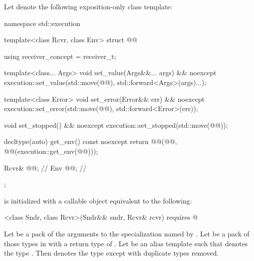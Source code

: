 \pnum
Let  denote the following exposition-only class template:
\begin{codeblock}
namespace std::execution {
  template<class Rcvr, class Env>
  struct @@ {
    using receiver_concept = receiver_t;

    template<class... Args>
    void set_value(Args&&... args) && noexcept {
      execution::set_value(std::move(@@), std::forward<Args>(args)...);
    }

    template<class Error>
    void set_error(Error&& err) && noexcept {
      execution::set_error(std::move(@@), std::forward<Error>(err));
    }

    void set_stopped() && noexcept {
      execution::set_stopped(std::move(@@));
    }

    decltype(auto) get_env() const noexcept {
      return @@(@@, @@(execution::get_env(@@)));
    }

    Rcvr& @@;                 // \expos
    Env @@;                    // \expos
  };
}
\end{codeblock}

\pnum
{}
is initialized with a callable object equivalent to the following:
\begin{codeblock}
[]<class Sndr, class Rcvr>(Sndr&& sndr, Rcvr& rcvr) requires @
\end{codeblock}

\pnum
Let  be a pack of the arguments
to the  specialization named by
.
Let  be a pack of those types in 
with a return type of .
Let  be an alias template
such that  denotes
the type .
Then  denotes
the type 
except with duplicate types removed.

